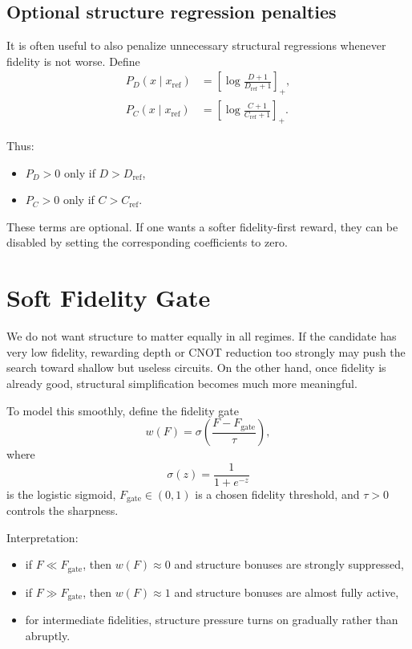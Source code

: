 \documentclass[11pt]{article}
\begin{document}
\subsection{Optional structure regression penalties}

It is often useful to also penalize unnecessary structural regressions whenever fidelity is not worse.
Define
\begin{align}
    P_D(x\mid x_{\mathrm{ref}})
    &= \left[\log\frac{D+1}{D_{\mathrm{ref}}+1}\right]_+, \\
    P_C(x\mid x_{\mathrm{ref}})
    &= \left[\log\frac{C+1}{C_{\mathrm{ref}}+1}\right]_+.
\end{align}

Thus:
\begin{itemize}
    \item $P_D > 0$ only if $D > D_{\mathrm{ref}}$,
    \item $P_C > 0$ only if $C > C_{\mathrm{ref}}$.
\end{itemize}

These terms are optional. If one wants a softer fidelity-first reward, they can be disabled by setting the corresponding coefficients to zero.

\section{Soft Fidelity Gate}

We do not want structure to matter equally in all regimes.
If the candidate has very low fidelity, rewarding depth or CNOT reduction too strongly may push the search toward shallow but useless circuits.
On the other hand, once fidelity is already good, structural simplification becomes much more meaningful.

To model this smoothly, define the fidelity gate
\begin{equation}
    w(F) = \sigma\!\left(\frac{F-F_{\mathrm{gate}}}{\tau}\right),
\end{equation}
where
\begin{equation}
    \sigma(z)=\frac{1}{1+e^{-z}}
\end{equation}
is the logistic sigmoid, $F_{\mathrm{gate}}\in(0,1)$ is a chosen fidelity threshold, and $\tau>0$ controls the sharpness.

Interpretation:
\begin{itemize}
    \item if $F \ll F_{\mathrm{gate}}$, then $w(F)\approx 0$ and structure bonuses are strongly suppressed,
    \item if $F \gg F_{\mathrm{gate}}$, then $w(F)\approx 1$ and structure bonuses are almost fully active,
    \item for intermediate fidelities, structure pressure turns on gradually rather than abruptly.
\end{itemize}
\end{document}
